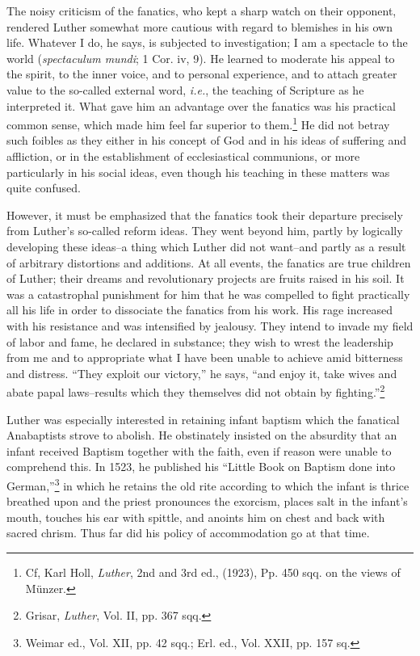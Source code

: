 The noisy criticism of the fanatics, who kept a sharp watch on
their opponent, rendered Luther somewhat more cautious with regard to
blemishes in his own life. Whatever I do, he says, is subjected
to investigation; I am a spectacle to the world (\textit{spectaculum mundi};
1 Cor. iv, 9). He learned to moderate his appeal to the spirit, to
the inner voice, and to personal experience, and to attach greater
value to the so-called external word, \textit{i.e.}, the teaching of Scripture
as he interpreted it. What gave him an advantage over the fanatics
was his practical common sense, which made him feel far superior to
them.\footnote{Cf, Karl Holl, \textit{Luther}, 2nd and 3rd ed., (1923), Pp. 450 sqq. on the views of Münzer.}
He did not betray such foibles as they either in his concept
of God and in his ideas of suffering and affliction, or in the
establishment of ecclesiastical communions, or more particularly in his
social ideas, even though his teaching in these matters was quite confused.

However, it must be emphasized that the fanatics took their departure
precisely from Luther’s so-called reform ideas. They went beyond him,
partly by logically developing these ideas--a thing which
Luther did not want--and partly as a result of arbitrary distortions
and additions. At all events, the fanatics are true children of Luther;
their dreams and revolutionary projects are fruits raised in his soil.
It was a catastrophal punishment for him that he was compelled to
fight practically all his life in order to dissociate the fanatics from
his work. His rage increased with his resistance and was intensified
by jealousy. They intend to invade my field of labor and fame, he
declared in substance; they wish to wrest the leadership from me and
to appropriate what I have been unable to achieve amid bitterness and
distress. “They exploit our victory,” he says, “and enjoy it, take wives
and abate papal laws--results which they themselves did not obtain
by fighting.”\footnote{Grisar, \textit{Luther}, Vol. II, pp. 367 sqq.}

Luther was especially interested in retaining infant baptism which
the fanatical Anabaptists strove to abolish. He obstinately insisted
on the absurdity that an infant received Baptism together with the
faith, even if reason were unable to comprehend this. In 1523, he
published his “Little Book on Baptism done into German,”\footnote
{Weimar ed., Vol. XII, pp. 42 sqq.; Erl. ed., Vol. XXII, pp. 157 sq.}
in which he retains the old rite according to which the infant is thrice
breathed upon and the priest pronounces the exorcism, places salt
in the infant’s mouth, touches his ear with spittle, and anoints him
on chest and back with sacred chrism. Thus far did his policy of
accommodation go at that time.

